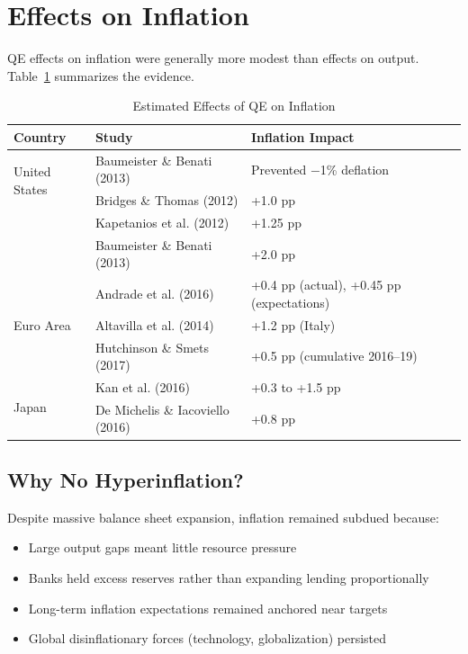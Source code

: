 \documentclass[11pt,a4paper]{article}
\begin{document}
\section{Effects on Inflation}

QE effects on inflation were generally more modest than effects on output. Table~\ref{tab:inflation} summarizes the evidence.

\begin{table}[H]
\centering
\caption{Estimated Effects of QE on Inflation}
\label{tab:inflation}
\begin{tabular}{llll}
\toprule
\textbf{Country} & \textbf{Study} & \textbf{Inflation Impact} \\
\midrule
\multirow{2}{*}{United States}
    & Baumeister \& Benati (2013) & Prevented $-$1\% deflation \\
\midrule
\multirow{3}{*}{United Kingdom}
    & Bridges \& Thomas (2012) & +1.0 pp \\
    & Kapetanios et al. (2012) & +1.25 pp \\
    & Baumeister \& Benati (2013) & +2.0 pp \\
\midrule
\multirow{3}{*}{Euro Area}
    & Andrade et al. (2016) & +0.4 pp (actual), +0.45 pp (expectations) \\
    & Altavilla et al. (2014) & +1.2 pp (Italy) \\
    & Hutchinson \& Smets (2017) & +0.5 pp (cumulative 2016--19) \\
\midrule
\multirow{2}{*}{Japan}
    & Kan et al. (2016) & +0.3 to +1.5 pp \\
    & De Michelis \& Iacoviello (2016) & +0.8 pp \\
\bottomrule
\end{tabular}
\end{table}

\subsection{Why No Hyperinflation?}

Despite massive balance sheet expansion, inflation remained subdued because:
\begin{itemize}
    \item Large output gaps meant little resource pressure
    \item Banks held excess reserves rather than expanding lending proportionally
    \item Long-term inflation expectations remained anchored near targets
    \item Global disinflationary forces (technology, globalization) persisted
\end{itemize}
\end{document}
